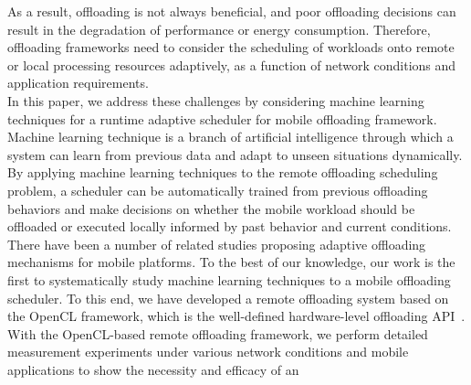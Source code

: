 \documentclass[10pt, conference, compsocconf]{IEEEtran}
\begin{document}
%
As a result, offloading is not always beneficial, and poor offloading
decisions can result in the degradation of performance or energy
consumption.
%
%
Therefore, offloading frameworks need to consider the scheduling of
workloads onto remote or local processing resources adaptively, as a
function of network conditions and application requirements.\\
%
%
\indent In this paper, we address these challenges by considering
machine learning techniques for a runtime adaptive scheduler for mobile
offloading framework.
%
Machine learning technique is a branch of artificial intelligence
through which a system can learn from previous data and adapt to
unseen situations dynamically.   
% 
By applying machine learning techniques to the remote offloading
scheduling problem, a scheduler can be automatically trained from
previous offloading behaviors and make decisions on whether the mobile
workload should be offloaded or executed locally informed by past
behavior and current conditions.
%
%
%
There have been a number of related studies proposing adaptive
offloading mechanisms for mobile platforms.
%
To the best of our knowledge, our work is the first to systematically
study machine learning techniques to a mobile offloading scheduler.
%
To this end, we have developed a remote offloading system based on the
OpenCL framework, which is the well-defined hardware-level offloading
API~\cite{opencl}.
%
With the OpenCL-based remote offloading framework, we perform
detailed measurement experiments under various network conditions and
mobile applications to show the necessity and efficacy of an
\end{document}
